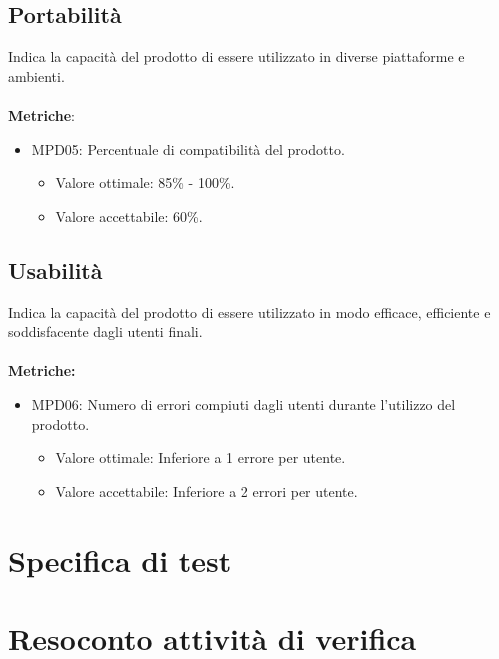 \documentclass[12pt]{article}
\begin{document}
\subsection{Portabilità}
	Indica la capacità del prodotto di essere utilizzato in diverse piattaforme e ambienti.
	\\\\
	\textbf{Metriche}:
		  \begin{itemize}
			\item MPD05: Percentuale di compatibilità del prodotto.
			\begin{itemize}	
				\item Valore ottimale: 85\% - 100\%.
				\item Valore accettabile: 60\%.
			\end{itemize}
		\end{itemize}


\subsection{Usabilità}
	Indica la capacità del prodotto di essere utilizzato in modo efficace, efficiente e soddisfacente dagli utenti finali.
	\\\\
	\textbf{Metriche:}
		  \begin{itemize}
			\item MPD06: Numero di errori compiuti dagli utenti durante l'utilizzo del prodotto.
			\begin{itemize}	
				\item Valore ottimale: Inferiore a 1 errore per utente.
				\item Valore accettabile: Inferiore a 2 errori per utente.
			\end{itemize}
		\end{itemize}
		  


\section{Specifica di test}
\section {Resoconto attività di verifica}
\end{document}
